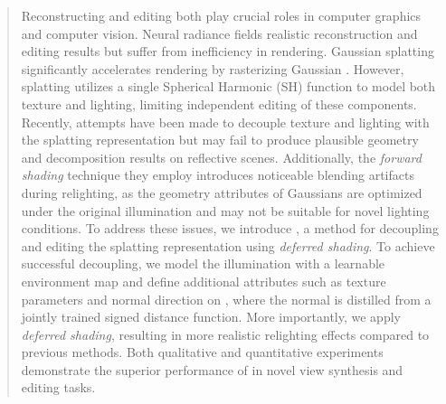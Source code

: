 \begin{abstract}
Reconstructing and editing  both play crucial roles in computer graphics and computer vision.
Neural radiance fields  %
realistic reconstruction and editing results but suffer from inefficiency in rendering. 
Gaussian splatting significantly accelerates rendering by rasterizing  Gaussian .
However,  splatting utilizes a single Spherical Harmonic (SH) function to model both texture and lighting,  limiting independent editing  of these components.  
Recently, attempts have been made to decouple texture and lighting with the  splatting representation but may fail to produce plausible geometry and decomposition results on reflective scenes. 
Additionally, the \textit{forward shading} technique they employ introduces noticeable blending artifacts during relighting, as the geometry attributes of Gaussians are optimized under the original illumination and may not be suitable for novel lighting conditions. 
To address these issues, we introduce \name, a method for decoupling and editing the  splatting representation using \textit{deferred shading}. 
To achieve successful decoupling, we model the illumination with a learnable environment map and define additional attributes such as texture parameters and normal direction on , where the normal is distilled from a jointly trained signed distance function. 
More importantly, we apply \textit{deferred shading}, resulting in more realistic relighting effects compared to previous methods. 
Both qualitative and quantitative experiments demonstrate the superior performance of \name in novel view synthesis and editing tasks. 
\end{abstract}
